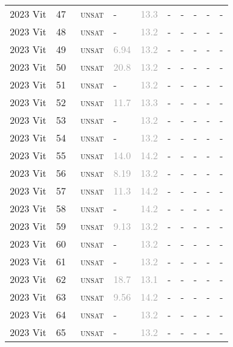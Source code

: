 \begin{center}
{\begin{longtable}{@{}llllllllll@{}}
2023 Vit & 47 & ~\textsc{unsat} & - & \textcolor{darkgray}{13.3} & - & - & - & - & - \\
2023 Vit & 48 & ~\textsc{unsat} & - & \textcolor{darkgray}{13.2} & - & - & - & - & - \\
2023 Vit & 49 & ~\textsc{unsat} & \textcolor{darkgray}{6.94} & \textcolor{darkgray}{13.2} & - & - & - & - & - \\
2023 Vit & 50 & ~\textsc{unsat} & \textcolor{darkgray}{20.8} & \textcolor{darkgray}{13.2} & - & - & - & - & - \\
2023 Vit & 51 & ~\textsc{unsat} & - & \textcolor{darkgray}{13.2} & - & - & - & - & - \\
2023 Vit & 52 & ~\textsc{unsat} & \textcolor{darkgray}{11.7} & \textcolor{darkgray}{13.3} & - & - & - & - & - \\
2023 Vit & 53 & ~\textsc{unsat} & - & \textcolor{darkgray}{13.2} & - & - & - & - & - \\
2023 Vit & 54 & ~\textsc{unsat} & - & \textcolor{darkgray}{13.2} & - & - & - & - & - \\
2023 Vit & 55 & ~\textsc{unsat} & \textcolor{darkgray}{14.0} & \textcolor{darkgray}{14.2} & - & - & - & - & - \\
2023 Vit & 56 & ~\textsc{unsat} & \textcolor{darkgray}{8.19} & \textcolor{darkgray}{13.2} & - & - & - & - & - \\
2023 Vit & 57 & ~\textsc{unsat} & \textcolor{darkgray}{11.3} & \textcolor{darkgray}{14.2} & - & - & - & - & - \\
2023 Vit & 58 & ~\textsc{unsat} & - & \textcolor{darkgray}{14.2} & - & - & - & - & - \\
2023 Vit & 59 & ~\textsc{unsat} & \textcolor{darkgray}{9.13} & \textcolor{darkgray}{13.2} & - & - & - & - & - \\
2023 Vit & 60 & ~\textsc{unsat} & - & \textcolor{darkgray}{13.2} & - & - & - & - & - \\
2023 Vit & 61 & ~\textsc{unsat} & - & \textcolor{darkgray}{13.2} & - & - & - & - & - \\
2023 Vit & 62 & ~\textsc{unsat} & \textcolor{darkgray}{18.7} & \textcolor{darkgray}{13.1} & - & - & - & - & - \\
2023 Vit & 63 & ~\textsc{unsat} & \textcolor{darkgray}{9.56} & \textcolor{darkgray}{14.2} & - & - & - & - & - \\
2023 Vit & 64 & ~\textsc{unsat} & - & \textcolor{darkgray}{13.2} & - & - & - & - & - \\
2023 Vit & 65 & ~\textsc{unsat} & - & \textcolor{darkgray}{13.2} & - & - & - & - & - \\

\end{longtable}}
\end{center}
